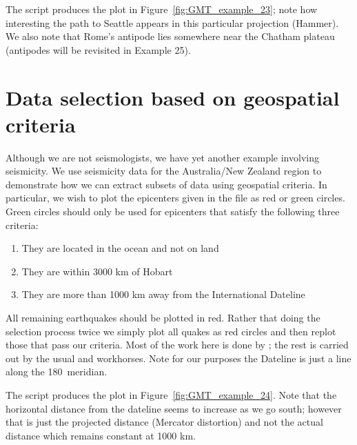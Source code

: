 
The script produces the plot in Figure~\ref{fig:GMT_example_23}; note how
interesting the path to Seattle appears in this particular projection (Hammer).
We also note that Rome's antipode lies somewhere near the Chatham plateau (antipodes
will be revisited in Example 25).


\section{Data selection based on geospatial criteria}

Although we are not seismologists, we have yet another example involving seismicity.
We use seismicity data for the Australia/New Zealand region to demonstrate how we can
extract subsets of data using geospatial criteria.  In particular, we wish to plot
the epicenters given in the file  as red or green circles.
Green circles should only be used for epicenters that satisfy the following three criteria:
\begin{enumerate}
\item They are located in the ocean and not on land
\item They are within 3000 km of Hobart
\item They are more than 1000 km away from the International Dateline
\end{enumerate}
All remaining earthquakes should be plotted in red.  Rather that doing the selection
process twice we simply plot all quakes as red circles and then replot those that
pass our criteria.  Most of the work here is done by ; the rest
is carried out by the usual  and  workhorses.  Note
for our purposes the Dateline is just a line along the 180\DS\ meridian.


The script produces the plot in Figure~\ref{fig:GMT_example_24}.  Note that the
horizontal distance from the dateline seems to increase as we go south; however that
is just the projected distance (Mercator distortion) and not the actual distance
which remains constant at 1000 km.



